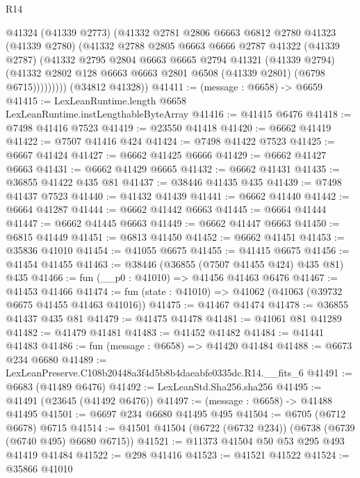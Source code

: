 \begin{lexlean}{R14}
\begin{coremodule}
              @41324
              (@41339 @2773)
              (@41332
                @2781
                @2806
                @6663
                @6812
                @2780
                @41323
                (@41339 @2780)
                (@41332
                  @2788
                  @2805
                  @6663
                  @6666
                  @2787
                  @41322
                  (@41339 @2787)
                  (@41332
                    @2795
                    @2804
                    @6663
                    @6665
                    @2794
                    @41321
                    (@41339 @2794)
                    (@41332 @2802 @128 @6663 @6663 @2801 @6508 (@41339 @2801) (@6798 @6715)))))))))
      (@34812 @41328))
@41411 := (message : @6658) -> @6659
@41415 := LexLeanRuntime.length @6658 LexLeanRuntime.instLengthableByteArray
@41416 := @41415 @6476
@41418 := @7498 @41416 @7523
@41419 := @23550 @41418
@41420 := @6662 @41419
@41422 := @7507 @41416 @424
@41424 := @7498 @41422 @7523
@41425 := @6667 @41424
@41427 := @6662 @41425 @6666
@41429 := @6662 @41427 @6663
@41431 := @6662 @41429 @6665
@41432 := @6662 @41431
@41435 := @36855 @41422 @435 @81
@41437 := @38446 @41435 @435
@41439 := @7498 @41437 @7523
@41440 := @41432 @41439
@41441 := @6662 @41440
@41442 := @6664 @41287
@41444 := @6662 @41442 @6663
@41445 := @6664 @41444
@41447 := @6662 @41445 @6663
@41449 := @6662 @41447 @6663
@41450 := @6815 @41449
@41451 := @6813 @41450
@41452 := @6662 @41451
@41453 := @35836 @41010
@41454 := @41055 @6675
@41455 := @41415 @6675
@41456 := @41454 @41455
@41463 := @38446 (@36855 (@7507 @41455 @424) @435 @81) @435
@41466 := fun (__p0 : @41010) => @41456 @41463 @6476
@41467 := @41453 @41466
@41474 := fun (state : @41010) => @41062 (@41063 (@39732 @6675 @41455 @41463 @41016))
@41475 := @41467 @41474
@41478 := @36855 @41437 @435 @81
@41479 := @41475 @41478
@41481 := @41061 @81 @41289
@41482 := @41479 @41481
@41483 := @41452 @41482
@41484 := @41441 @41483
@41486 := fun (message : @6658) => @41420 @41484
@41488 := @6673 @234 @6680
@41489 := LexLeanPreserve.C108b20448a3f4d5b8b4daeabfe0335dc.R14.__fits_6
@41491 := @6683 (@41489 @6476)
@41492 := LexLeanStd.Sha256.sha256
@41495 := @41491 (@23645 (@41492 @6476))
@41497 := (message : @6658) -> @41488 @41495
@41501 := @6697 @234 @6680 @41495 @495
@41504 := @6705 (@6712 @6678) @6715
@41514 := @41501 @41504 (@6722 (@6732 @234)) (@6738 (@6739 (@6740 @495) @6680 @6715))
@41521 := @11373 @41504 @50 @53 @295 @493 @41419 @41484
@41522 := @298 @41416
@41523 := @41521 @41522
@41524 := @35866 @41010

\end{coremodule}
\end{lexlean}
